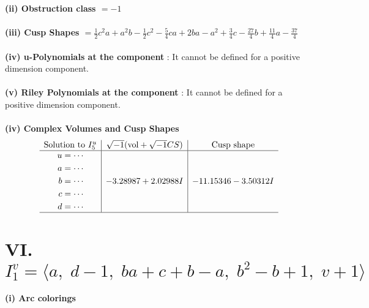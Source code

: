 \documentclass[1p]{elsarticle_modified}
\theoremstyle{definition}
\newcommand{\I}{\sqrt{-1}}
\begin{document}
\flushleft \textbf{(ii) Obstruction class $= -1$}\\~\\
\flushleft \textbf{(iii) Cusp Shapes $= \frac{1}{2} c^2 a+a^2 b-\frac{1}{2} c^2-\frac{5}{4} c a+2 b a- a^2+\frac{3}{4} c-\frac{27}{4} b+\frac{11}{4} a-\frac{37}{4}$}\\~\\
\flushleft \textbf{(iv) u-Polynomials at the component} : It cannot be defined for a positive dimension component.\\~\\
\flushleft \textbf{(v) Riley Polynomials at the component} : It cannot be defined for a positive dimension component.\\~\\
\newpage\flushleft \textbf{(iv) Complex Volumes and Cusp Shapes}
$$\begin{array}{c|c|c} 
\text{Solution to }I^u_{5}& \I (\text{vol} + \sqrt{-1}CS) & \text{Cusp shape}\\
 \hline 
\begin{aligned}
u &= \cdots \\
a &= \cdots \\
b &= \cdots \\
c &= \cdots \\
d &= \cdots\end{aligned}
 & -3.28987 + 2.02988 I & -11.15346 - 3.50312 I\\
 \hline 
 \end{array}
$$\newpage\renewcommand{\arraystretch}{1}
\centering \section*{VI. $I^v_{1}= \langle a,\;d-1,\;b a+c+b- a,\;b^2- b+1,\;v+1 \rangle$}
\flushleft \textbf{(i) Arc colorings}\\
\end{document}
